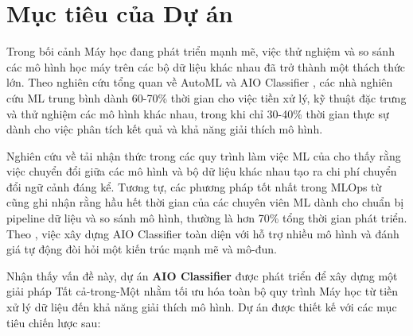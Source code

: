 \section{Mục tiêu của Dự án}\label{sec:project-goals}

\noindent
Trong bối cảnh Máy học đang phát triển mạnh mẽ, việc thử nghiệm và so sánh các mô hình học máy trên các bộ dữ liệu khác nhau đã trở thành một thách thức lớn. Theo nghiên cứu tổng quan về AutoML và AIO Classifier \cite{guiyang2020}, các nhà nghiên cứu ML trung bình dành 60-70\% thời gian cho việc tiền xử lý, kỹ thuật đặc trưng và thử nghiệm các mô hình khác nhau, trong khi chỉ 30-40\% thời gian thực sự dành cho việc phân tích kết quả và khả năng giải thích mô hình.

\vspace{1em}
\noindent
Nghiên cứu về tải nhận thức trong các quy trình làm việc ML của \cite{dondi2023} cho thấy rằng việc chuyển đổi giữa các mô hình và bộ dữ liệu khác nhau tạo ra chi phí chuyển đổi ngữ cảnh đáng kể. Tương tự, các phương pháp tốt nhất trong MLOps từ \cite{google-mlops} cũng ghi nhận rằng hầu hết thời gian của các chuyên viên ML dành cho chuẩn bị pipeline dữ liệu và so sánh mô hình, thường là hơn 70\% tổng thời gian phát triển. Theo \cite{domingos2012}, việc xây dựng AIO Classifier toàn diện với hỗ trợ nhiều mô hình và đánh giá tự động đòi hỏi một kiến trúc mạnh mẽ và mô-đun.

\vspace{1em}
\noindent
Nhận thấy vấn đề này, dự án \textbf{AIO Classifier} được phát triển để xây dựng một giải pháp Tất cả-trong-Một nhằm tối ưu hóa toàn bộ quy trình Máy học từ tiền xử lý dữ liệu đến khả năng giải thích mô hình. Dự án được thiết kế với các mục tiêu chiến lược sau:

